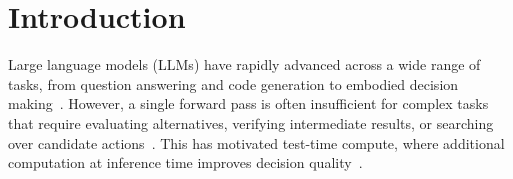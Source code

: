 \section{Introduction}
\label{sec:intro}
\vspace{-0.1in}


Large language models (LLMs) have rapidly advanced across a wide range of tasks, from question answering and code generation to embodied decision making~\cite{yao2023react,
shinn2023reflexion, zhou2024lats, li2025mass, li2026graph}. However, a single forward pass is often insufficient for complex tasks that require evaluating alternatives, verifying intermediate results, or searching over candidate actions~\cite{yao2023tree, hao2023reasoning, snell2024scaling}. This has motivated test-time compute, where additional computation at inference time improves decision quality~\cite{wang2026flare,DBLP:journals/corr/abs-2506-12928}.

